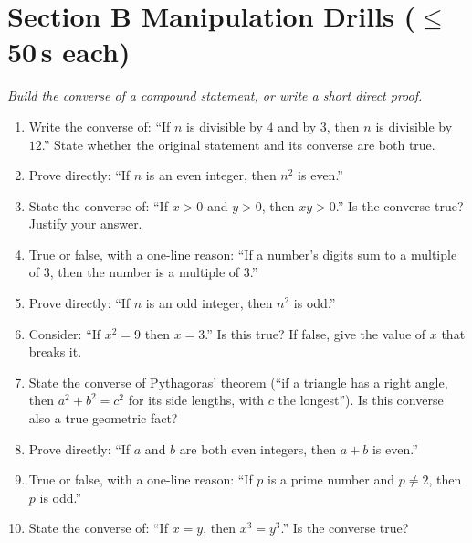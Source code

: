 \documentclass[11pt,a4paper]{article}
\begin{document}
\section*{Section B \quad Manipulation Drills \hfill{\normalfont\small($\leq$50\,s each)}}

\noindent\textit{Build the converse of a compound statement, or write a short direct proof.}

\begin{enumerate}

\item Write the converse of: ``If $n$ is divisible by $4$ and by $3$, then $n$ is divisible by $12$.'' State whether the original statement and its converse are both true.

\item Prove directly: ``If $n$ is an even integer, then $n^2$ is even.''

\item State the converse of: ``If $x>0$ and $y>0$, then $xy>0$.'' Is the converse true? Justify your answer.

\item True or false, with a one-line reason: ``If a number's digits sum to a multiple of $3$, then the number is a multiple of $3$.''

\item Prove directly: ``If $n$ is an odd integer, then $n^2$ is odd.''

\item Consider: ``If $x^2 = 9$ then $x = 3$.'' Is this true? If false, give the value of $x$ that breaks it.

\item State the converse of Pythagoras' theorem (``if a triangle has a right angle, then $a^2+b^2=c^2$ for its side lengths, with $c$ the longest''). Is this converse also a true geometric fact?

\item Prove directly: ``If $a$ and $b$ are both even integers, then $a+b$ is even.''

\item True or false, with a one-line reason: ``If $p$ is a prime number and $p \neq 2$, then $p$ is odd.''

\item State the converse of: ``If $x=y$, then $x^3 = y^3$.'' Is the converse true?

\end{enumerate}
\end{document}
